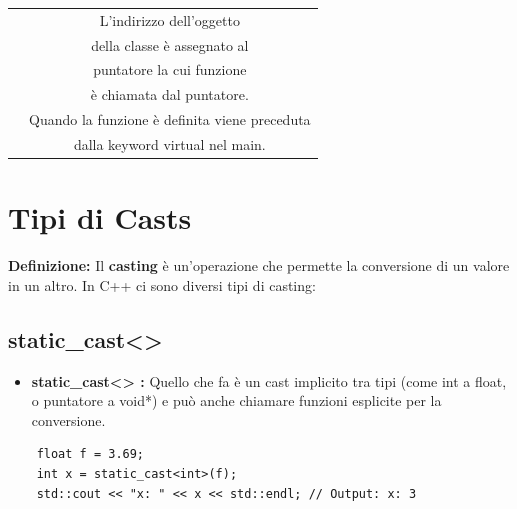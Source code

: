 \begin{tabular}{|c|c|}
	\textsf{\small } & \textsf{\small L'indirizzo dell'oggetto} \\
	\textsf{\small } & \textsf{\small della classe è assegnato al} \\
	\textsf{\small } & \textsf{\small puntatore la cui funzione} \\
	\textsf{\small } & \textsf{\small è chiamata dal puntatore.} \\
	\hline
	\textsf{\small } & \textsf{\small Quando la funzione è definita viene preceduta} \\
	\textsf{\small } & \textsf{\small dalla keyword virtual nel main.} \\
	\hline
\end{tabular}


\label{cast_types}

\newpage

\section{Tipi di Casts}

\textsf{\small \textbf{Definizione:} Il \textbf{casting} è un'operazione che permette la conversione di un valore in un altro. In C++ ci sono diversi tipi di casting: } \\

\subsection{static\_cast<>}

\begin{itemize}
	\item \textsf{\small \textbf{static\_cast<> :} Quello che fa è un cast implicito tra tipi (come int a float, o puntatore a void*) e può anche chiamare funzioni esplicite per la conversione. }
\end{itemize}

\begin{lstlisting}
	float f = 3.69;
	int x = static_cast<int>(f);
	std::cout << "x: " << x << std::endl; // Output: x: 3 
\end{lstlisting}

